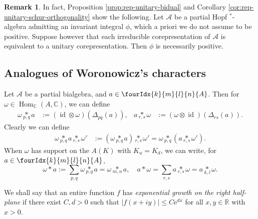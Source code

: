\documentclass[10pt]{article}
\DeclareMathOperator{\id}{id}
\DeclareMathOperator{\Hom}{Hom}
\newcommand{\C}{\mathbb{C}}
\newcommand{\R}{\mathbb{R}}
\newcommand{\Gr}[5]{\fourIdx{#2}{#4}{#3}{#5}{#1}}%
\newcommand{\aste}[1]{\underset{#1}{\ast}}
\theoremstyle{definition}
\newtheorem{Rem}[Theorem]{Remark}
\numberwithin{equation}{section}
\begin{document}
\begin{Rem}\label{RemPos} In fact, Proposition \ref{prop:rep-unitary-bidual} and Corollary \ref{cor:rep-unitary-schur-orthogonality} show the following. Let $\mathscr{A}$ be a partial Hopf $^*$-algebra admitting an invariant integral $\phi$, which a priori we do not assume to be positive. Suppose however that each irreducible corepresentation of $\mathscr{A}$ is equivalent to a unitary corepresentation. Then $\phi$ is necessarily positive.
\end{Rem} 

\subsection{Analogues of Woronowicz's  characters}

Let $\mathscr{A}$ be a partial bialgebra, and $a\in \Gr{A}{k}{l}{m}{n}$. Then for $\omega \in \Hom_{\C}(A,\C)$, we can define
\begin{align*}
  \omega \aste{p,q} a
&:= (\id \otimes \omega) (\Delta_{pq}(a)), & a \aste{r,s}
\omega&:=(\omega \otimes \id)(\Delta_{rs}(a)).\end{align*} Clearly we can define
\begin{align*} \omega \aste{p,q} a \aste{r,s}
\omega'&:= (\omega \aste{p,q} a)\aste{r,s} \omega' = \omega \aste{p,q}(a \aste{r,s} \omega').\end{align*}
When $\omega$ has support on the $A(K)$ with $K_u=K_d$, we can write, for $a\in \Gr{A}{k}{l}{m}{n}$, \[\omega\ast a := \sum_{p,q} \omega\aste{p,q}a = \omega\aste{m,n}a,\quad  a\ast \omega = \sum_{r,s} a\aste{r,s}\omega = a\aste{k,l}\omega.\] 

We shall say that an entire function $f$ has \emph{exponential growth
  on the right half-plane} if there exist $C,d>0$ such that $|f(x+iy)|\leq
C\mathrm{e}^{dx}$  for all $x,y\in \R$ with $x>0$. 
\end{document}
